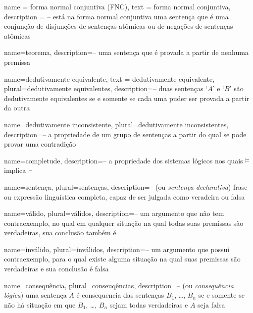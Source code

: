 {
  name = forma normal conjuntiva (FNC),
  text = forma normal conjuntiva,
  description = {-- está na forma normal conjuntiva uma sentença que é uma conjunção de disjunções de sentenças atômicas ou de negações de sentenças atômicas}
}

  
  {
  name=teorema,
  description={-- uma sentença que é provada a partir de nenhuma premissa}
  }
  
  {
    name=dedutivamente equivalente,
    text = dedutivamente equivalente,
    plural=dedutivamente equivalentes,
  description={-- duas sentenças `$A$' e `$B$' são  dedutivamente equivalentes  se e somente se cada  uma puder ser provada a partir da outra}
  }
  
  {    name={dedutivamente inconsistente}, 
       plural={dedutivamente inconsistentes},
    description={-- a propriedade de um grupo de sentenças a partir do qual se pode provar uma contradição}
  }
  
  {
  name=completude,
  description={-- a propriedade dos sistemas lógicos nos quais $\vDash $ implica $\vdash$}
  }
  
  {
  name=sentença,
  plural=sentenças,
  description={-- (ou \textit{sentença declarativa}) frase ou expressão linguística completa, capaz de ser julgada como veradeira ou falsa}
  }
  
  {
  name=válido,
  plural=válidos,
  description={-- um argumento que não tem contraexemplo, no qual em qualquer situação na qual todas suas premissas são verdadeiras, sua conclusão também é}
  }
  
  {
  name=inválido,
  plural=inválidos,
  description={-- um argumento que possui contraexemplo, para o qual existe alguma situação na qual suas premissas são verdadeiras e sua conclusão é falsa}
  }
  
    {
    name=consequência,
    plural=conseuqências,
    description={-- (ou \textit{consequência lógica}) uma sentença $A$ é consequencia das sentenças $B_1$, \dots, $B_n$ se e somente se não há situação em que $B_1$, \dots, $B_n$ sejam todas verdadeiras e $A$ seja falsa}
    }
  
